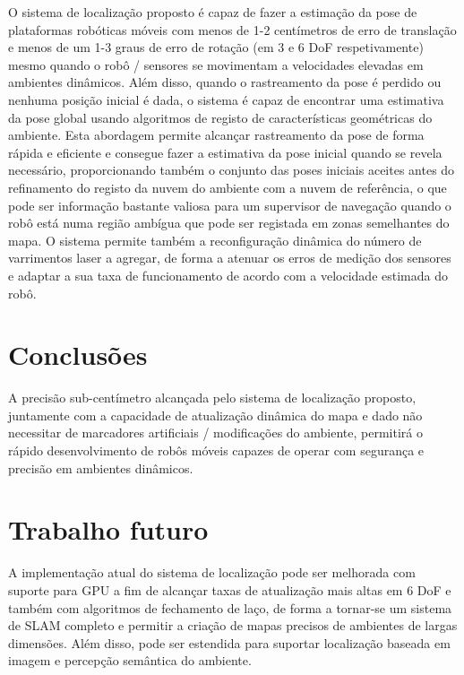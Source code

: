 \documentclass[9pt,a4paper]{extarticle}
\begin{document}
\begin{multicols}{2}
O sistema de localização proposto é capaz de fazer a estimação da pose de plataformas robóticas móveis com menos de 1-2 centímetros de erro de translação e menos de um 1-3 graus de erro de rotação (em 3 e 6 DoF respetivamente) mesmo quando o robô / sensores se movimentam a velocidades elevadas em ambientes dinâmicos. Além disso, quando o rastreamento da pose é perdido ou nenhuma posição inicial é dada, o sistema é capaz de encontrar uma estimativa da pose global usando algoritmos de registo de características geométricas do ambiente. Esta abordagem permite alcançar rastreamento da pose de forma rápida e eficiente e consegue fazer a estimativa da pose inicial quando se revela necessário, proporcionando também o conjunto das poses iniciais aceites antes do refinamento do registo da nuvem do ambiente com a nuvem de referência, o que pode ser informação bastante valiosa para um supervisor de navegação quando o robô está numa região ambígua que pode ser registada em zonas semelhantes do mapa. O sistema permite também a reconfiguração dinâmica do número de varrimentos laser a agregar, de forma a atenuar os erros de medição dos sensores e adaptar a sua taxa de funcionamento de acordo com a velocidade estimada do robô.


\section{Conclusões}

A precisão sub-centímetro alcançada pelo sistema de localização proposto, juntamente com a capacidade de atualização dinâmica do mapa e dado não necessitar de marcadores artificiais / modificações do ambiente, permitirá o rápido desenvolvimento de robôs móveis capazes de operar com segurança e precisão em ambientes dinâmicos.


\section{Trabalho futuro}

A implementação atual do sistema de localização pode ser melhorada com suporte para GPU a fim de alcançar taxas de atualização mais altas em 6 DoF e também com algoritmos de fechamento de laço, de forma a tornar-se um sistema de SLAM completo e permitir a criação de mapas precisos de ambientes de largas dimensões. Além disso, pode ser estendida para suportar localização baseada em imagem e percepção semântica do ambiente.





\end{multicols}
\end{document}
